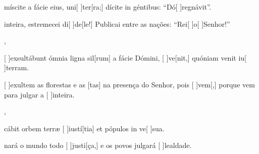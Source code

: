 {  {\item {}míscite a fácie eius, uni[ ]{ter}[ra;] dícite in géntibus: ``Dó[ ]{re}{gná}vit''.~\Antiphona}%
    {\item {} inteira, estremecei di[ ]{de}[le!] Publicai entre as nações: ``Rei[ ]{o}[ ]{Se}{nhor}!''~\Antiphona},
  {\item {}[ ]{ex}sultábunt ómnia ligna sil[rum] a fácie Dómini, [ ]{ve}[nit,] quóniam venit iu[ ]{ter}ram.~\Antiphona}%
    {\item {}[ ]{e}xultem as florestas e as [tas] na presença do Senhor, pois [ ]{vem}[,] porque vem para julgar a [ ]{in}{tei}ra.~\Antiphona},
  {\item {}cábit orbem terræ [ ]{iu}{stí}[tia] et pópulos in ve[ ]{su}a.~\Antiphona}%
    {\item {}nará o mundo todo [ ]{jus}{ti}[ça,] e os povos julgará [ ]{le}{al}{da}de.~\Antiphona}
}